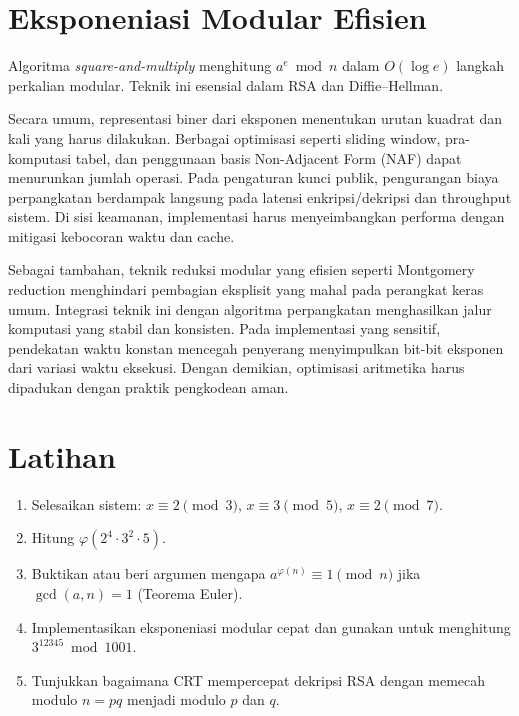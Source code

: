 \documentclass[../main.tex]{subfiles}
\begin{document}
\section{Eksponeniasi Modular Efisien}
Algoritma \emph{square-and-multiply} menghitung \(a^e\bmod n\) dalam \(O(\log e)\) langkah perkalian modular. Teknik ini esensial dalam RSA dan Diffie--Hellman.

Secara umum, representasi biner dari eksponen menentukan urutan kuadrat dan kali yang harus dilakukan. Berbagai optimisasi seperti sliding window, pra-komputasi tabel, dan penggunaan basis Non-Adjacent Form (NAF) dapat menurunkan jumlah operasi. Pada pengaturan kunci publik, pengurangan biaya perpangkatan berdampak langsung pada latensi enkripsi/dekripsi dan throughput sistem. Di sisi keamanan, implementasi harus menyeimbangkan performa dengan mitigasi kebocoran waktu dan cache.

Sebagai tambahan, teknik reduksi modular yang efisien seperti Montgomery reduction menghindari pembagian eksplisit yang mahal pada perangkat keras umum. Integrasi teknik ini dengan algoritma perpangkatan menghasilkan jalur komputasi yang stabil dan konsisten. Pada implementasi yang sensitif, pendekatan waktu konstan mencegah penyerang menyimpulkan bit-bit eksponen dari variasi waktu eksekusi. Dengan demikian, optimisasi aritmetika harus dipadukan dengan praktik pengkodean aman.

\section{Latihan}
\begin{enumerate}
  \item Selesaikan sistem: \(x\equiv 2\pmod 3\), \(x\equiv 3\pmod 5\), \(x\equiv 2\pmod 7\).
  \item Hitung \(\varphi(2^4\cdot 3^2\cdot 5)\).
  \item Buktikan atau beri argumen mengapa \(a^{\varphi(n)}\equiv 1\pmod n\) jika \(\gcd(a,n)=1\) (Teorema Euler).
  \item Implementasikan eksponeniasi modular cepat dan gunakan untuk menghitung \(3^{12345}\bmod 1001\).
  \item Tunjukkan bagaimana CRT mempercepat dekripsi RSA dengan memecah modulo \(n=pq\) menjadi modulo \(p\) dan \(q\).
\end{enumerate}
\end{document}
